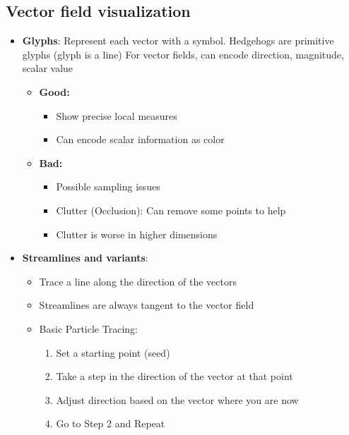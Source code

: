 \documentclass{report}
\begin{document}
    \pagebreak 
    \subsection{Vector field visualization}
    \begin{itemize}
        \item \textbf{Glyphs}: Represent each vector with a symbol. Hedgehogs are primitive glyphs (glyph is a line) 
            \bigbreak \noindent 
            For vector fields, can encode direction, magnitude, scalar value
            \begin{itemize}
                \item \textbf{Good:}
                    \begin{itemize}
                        \item Show precise local measures
                        \item Can encode scalar information as color
                    \end{itemize}
                \item \textbf{Bad:}
                    \begin{itemize}
                        \item Possible sampling issues
                        \item Clutter (Occlusion): Can remove some points to help
                        \item Clutter is worse in higher dimensions
                    \end{itemize}
            \end{itemize}
        \item \textbf{Streamlines and variants}: 
            \begin{itemize}
                \item Trace a line along the direction of the vectors
                \item Streamlines are always tangent to the vector field
                \item Basic Particle Tracing:
                    \begin{enumerate}
                        \item Set a starting point (seed)
                        \item Take a step in the direction of the vector at that point
                        \item Adjust direction based on the vector where you are now
                        \item Go to Step 2 and Repeat

\end{enumerate}
\end{itemize}
\end{itemize}
\end{document}
